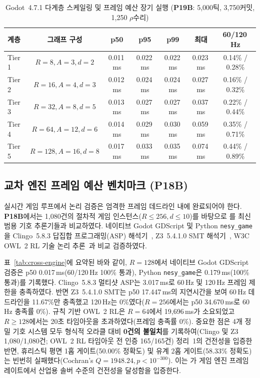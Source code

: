 \begin{table}[!tbp]
\caption{Godot~4.7.1 다계층 스케일링 및 프레임 예산 장기 실행 (\textbf{P19B}: 5,000틱, 3,750커밋, 1,250 $\rho$수리)}
\label{tab:p19b-soak}
\centering
\scriptsize
\setlength{\tabcolsep}{2.2pt}
\begin{tabularx}{\columnwidth}{@{}>{\raggedright\arraybackslash}Xcccccc@{}}
\toprule
\textbf{계층} & \textbf{그래프 구성} & \textbf{p50} & \textbf{p95} & \textbf{p99} & \textbf{최대} & \textbf{60/120\,Hz} \\
\midrule
Tier 1 & $R{=}8, A{=}3, d{=}2$    & 0.011\,ms & 0.022\,ms & 0.022\,ms & 0.023\,ms & 0.14\% / 0.28\% \\
Tier 2 & $R{=}16, A{=}4, d{=}3$   & 0.012\,ms & 0.024\,ms & 0.024\,ms & 0.027\,ms & 0.16\% / 0.32\% \\
Tier 3 & $R{=}32, A{=}8, d{=}5$   & 0.013\,ms & 0.027\,ms & 0.027\,ms & 0.037\,ms & 0.22\% / 0.44\% \\
Tier 4 & $R{=}64, A{=}12, d{=}6$  & 0.014\,ms & 0.029\,ms & 0.030\,ms & 0.059\,ms & 0.35\% / 0.71\% \\
Tier 5 & $R{=}128, A{=}16, d{=}8$ & 0.017\,ms & 0.033\,ms & 0.035\,ms & 0.074\,ms & 0.44\% / 0.89\% \\
\bottomrule
\end{tabularx}
\end{table}

\subsection{교차 엔진 프레임 예산 벤치마크 (\textbf{P18B})}\label{sec:tog-p18b}
실시간 게임 루프에서 논리 검증은 엄격한 프레임 데드라인 내에 완료되어야 한다. \textbf{P18B}에서는 1,080건의 절차적 게임 인스턴스($R \le 256, d \le 10$)를 바탕으로 \system{}를 최신 범용 기호 추론기들과 비교하였다. 네이티브 Godot GDScript 및 Python \texttt{nesy\_game}을 Clingo~5.8.3 답집합 프로그래밍(ASP) 해석기~\cite{gebser2019clingo}, Z3~5.4.1.0 SMT 해석기~\cite{demoura2008z3}, W3C OWL~2 RL 기술 논리 추론~\cite{motik2012owl2profiles}과 비교 검증하였다.

표~\ref{tab:cross-engine}에 요약된 바와 같이, $R{=}128$에서 네이티브 Godot GDScript 검증은 p50 0.017\,ms(60/120\,Hz 100\% 통과), Python \texttt{nesy\_game}은 0.179\,ms(100\% 통과)를 기록했다. Clingo~5.8.3 멀티샷 ASP는 3.017\,ms로 60\,Hz 및 120\,Hz 프레임 제한을 충족하였다. 반면 Z3~5.4.1.0 SMT는 p50 17.447\,ms의 지연시간을 보여 60\,Hz 데드라인을 11.67\%만 충족했고 120\,Hz는 0\%였다($R{=}256$에서는 p50 34.670\,ms로 60\,Hz 충족률 0\%). 규칙 기반 OWL~2 RL은 $R{=}64$에서 19,696\,ms가 소요되었고 $R \ge 128$에서는 20초 타임아웃을 초과하였다(프레임 충족률 0\%). 중요한 점은 4개 정밀 기호 시스템 모두 형식적 오라클 대비 \textbf{0건의 불일치}를 기록하여(Clingo 및 Z3 1,080/1,080건; OWL~2 RL 타임아웃 전 인증 165/165건) 정리~1의 건전성을 입증한 반면, 휴리스틱 평면 1홉 게이트(50.00\% 정확도) 및 유계 2홉 게이트(58.33\% 정확도)는 빈번히 실패했다(Cochran's $Q = 1948.24, p < 10^{-300}$). 이는 \system{}가 게임 엔진 프레임 레이트에서 산업용 솔버 수준의 건전성을 달성함을 입증한다.

